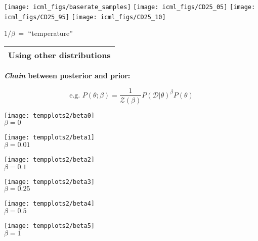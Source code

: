 \documentclass[25pt,landscape]{foils}
\newcommand{\Gray}{\textcolor{mygray}}
\newcommand{\Green}{\textcolor{mypine}}
\newcommand{\myfoilhead}[1]{
\newpage
\vspace*{-1cm}
\Gray{
\begin{tabular*}{\textwidth}{l}
{\bf \Huge #1} \\
\bottomrule
\end{tabular*}}}
\newcommand{\D}{\mathcal{D}}
\newcommand{\Z}{\mathcal{Z}}
\begin{document}
\vfill

\texttt{[image: icml\_figs/baserate\_samples]}
\texttt{[image: icml\_figs/CD25\_05]}
\texttt{[image: icml\_figs/CD25\_95]}
\texttt{[image: icml\_figs/CD25\_10]}


\vfill

$1/\beta \,= $ ``temperature''

\myfoilhead{Using other distributions}

\vspace*{1.5cm}

\Green{\bf \emph{Chain} between posterior and prior:}

\vspace*{-1cm}

\begin{center}
\[
\mbox{e.g.\ }P(\theta;\beta) = \frac{1}{\Z(\beta)} P(\D|\theta)^\beta P(\theta)
\]

\vspace{-2cm}

\parbox[b]{0.125\textwidth}{\begin{center}\texttt{[image: tempplots2/beta0]}\\\small $\beta=0$\end{center}}
\hfill
\parbox[b]{0.125\textwidth}{\begin{center}\texttt{[image: tempplots2/beta1]}\\\small $\beta=0.01$\end{center}}
\hfill
\parbox[b]{0.125\textwidth}{\begin{center}\texttt{[image: tempplots2/beta2]}\\\small $\beta=0.1$\end{center}}
\hfill
\parbox[b]{0.125\textwidth}{\begin{center}\texttt{[image: tempplots2/beta3]}\\\small $\beta=0.25$\end{center}}
\hfill
\parbox[b]{0.125\textwidth}{\begin{center}\texttt{[image: tempplots2/beta4]}\\\small $\beta=0.5$\end{center}}
\hfill
\parbox[b]{0.125\textwidth}{\begin{center}\texttt{[image: tempplots2/beta5]}\\\small $\beta=1$\end{center}}
\end{center}
\end{document}
